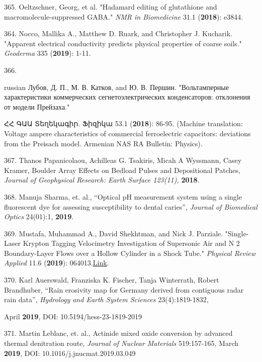 365. Oeltzschner, Georg, et al. "Hadamard editing of glutathione and macromolecule-suppressed GABA." \textit{NMR in Biomedicine} 31.1 (\textbf{2018}): e3844.

364. Nocco, Mallika A., Matthew D. Ruark, and Christopher J. Kucharik. "Apparent electrical conductivity predicts physical properties of coarse soils." \textit{Geoderma} 335 (\textbf{2019}): 1-11.

366. \begin{otherlanguage*}{russian}
Лубов, Д. П., М. В. Катков, and Ю. В. Першин. "Вольт\textendash{}амперные характеристики коммерческих сегнетоэлектрических конденсаторов: отклонения от модели Прейзаха."
\end{otherlanguage*} \textarmenian{ՀՀ ԳԱԱ Տեղեկագիր. Ֆիզիկա}  53.1 (\textbf{2018}): 86-95. (Machine translation: Voltage \textendash{} ampere characteristics of commercial ferroelectric capacitors: deviations from the Preisach model. Armenian NAS RA Bulletin: Physics).

367. Thanos Papanicolaou, Achilleas G. Tsakiris, Micah A Wyssmann, Casey Kramer, Boulder Array Effects on Bedload Pulses and Depositional Patches, \textit{Journal of Geophysical Research: Earth Surface 123(11),} \textbf{2018}.

368. Manuja Sharma, et. al., ``Optical pH measurement system using a single fluorescent dye for assessing susceptibility to dental caries'', \textit{Journal of Biomedical Optics} 24(01):1, \textbf{2019}.

369. Mustafa, Muhammad A., David Shekhtman, and Nick J. Parziale. "Single-Laser Krypton Tagging Velocimetry Investigation of Supersonic Air and N 2 Boundary-Layer Flows over a Hollow Cylinder in a Shock Tube." \textit{Physical Review Applied} 11.6 (\textbf{2019}): 064013.\href{https://www.researchgate.net/publication/333677717\_Single-Laser\_Krypton\_Tagging\_Velocimetry\_Investigation\_of\_Supersonic\_Air\_and\_N2\_Boundary-Layer\_Flows\_over\_a\_Hollow\_Cylinder\_in\_a\_Shock\_Tube}{Link}.

370. Karl Auerswald, Franziska K. Fischer, Tanja Winterrath, Robert Brandhuber, ``Rain erosivity map for Germany derived from contiguous radar rain data'', \textit{Hydrology and Earth System Sciences} 23(4):1819-1832, 

April \textbf{2019}, DOI: 10.5194/hess-23-1819-2019

371. Martin Leblanc, et. al., Actinide mixed oxide conversion by advanced thermal denitration route, \textit{Journal of Nuclear Materials} 519:157-165, March \textbf{2019}, DOI: 10.1016/j.jnucmat.2019.03.049

